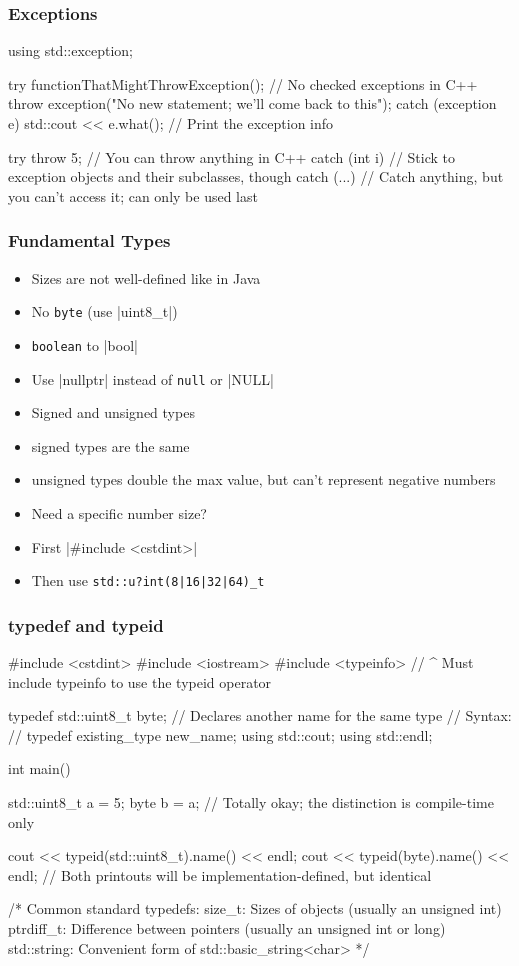 \documentclass[glossy]{beamer}
\begin{document}
\begin{frame}[fragile=singleslide]
  \frametitle{Exceptions}
  \begin{cppcode}
using std::exception;

try {
  functionThatMightThrowException(); // No checked exceptions in C++
  throw exception("No new statement; we'll come back to this");
}
catch (exception e) {
  std::cout << e.what(); // Print the exception info
}

try {
  throw 5; // You can throw anything in C++
} catch (int i) {
  // Stick to exception objects and their subclasses, though
} catch (...) {
  // Catch anything, but you can't access it; can only be used last
}
  \end{cppcode}
\end{frame}

\begin{frame}[fragile=singleslide]
  \frametitle{Fundamental Types}
  \begin{itemize}
    \item Sizes are not well-defined like in Java
    \item No \verb|byte| (use \cppinline|uint8_t|)
    \item \verb|boolean| to \cppinline|bool|
    \item Use \cppinline|nullptr| instead of \verb|null| or \cppinline|NULL|
    \item Signed and unsigned types
    \item signed types are the same
    \item unsigned types double the max value, but can't represent negative numbers
    \item Need a specific number size?
    \item First \cppinline|#include <cstdint>|
    \item Then use \verb!std::u?int(8|16|32|64)_t!
  \end{itemize}
\end{frame}

\begin{frame}[fragile=singleslide]
  \frametitle{typedef and typeid}
  \begin{cppcode}
#include <cstdint>
#include <iostream>
#include <typeinfo>
// ^ Must include typeinfo to use the typeid operator

typedef std::uint8_t byte; // Declares another name for the same type
// Syntax:
//    typedef existing_type new_name;
using std::cout;
using std::endl; 

int main() { 
  std::uint8_t a = 5; 
  byte b = a; 
  // Totally okay; the distinction is compile-time only 

  cout << typeid(std::uint8_t).name() << endl; 
  cout << typeid(byte).name() << endl; 
  // Both printouts will be implementation-defined, but identical 

  /* Common standard typedefs: 
        size_t: Sizes of objects (usually an unsigned int)
        ptrdiff_t: Difference between pointers (usually an unsigned int or long) 
        std::string: Convenient form of std::basic_string<char> 
  */ 
}
  \end{cppcode}
\end{frame}
\end{document}

